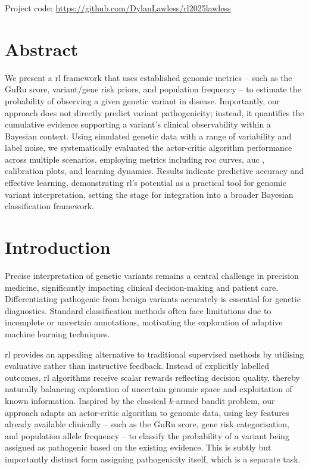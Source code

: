  
\vfill
\noindent Project code: \href{https://github.com/DylanLawless/rl2025lawless}{https://github.com/DylanLawless/rl2025lawless}

\clearpage
 

\section*{Abstract}

We present a \ac{rl} framework that uses established genomic metrics -- such as the GuRu score, variant/gene risk priors, and population frequency -- to estimate the probability of observing a given genetic variant in disease. Importantly, our approach does not directly predict variant pathogenicity; instead, it quantifies the cumulative evidence supporting a variant’s clinical observability within a Bayesian context. Using simulated genetic data with a range of variability and label noise, we systematically evaluated the actor-critic algorithm performance across multiple scenarios, employing metrics including \ac{roc} curves, \ac{auc} , calibration plots, and learning dynamics. Results indicate predictive accuracy and effective learning, demonstrating \ac{rl}’s potential as a practical tool for genomic variant interpretation, setting the stage for integration into a broader Bayesian classification framework.


\section{Introduction}
Precise interpretation of genetic variants remains a central challenge in precision medicine, significantly impacting clinical decision-making and patient care. Differentiating pathogenic from benign variants accurately is essential for genetic diagnostics. Standard classification methods often face limitations due to incomplete or uncertain annotations, motivating the exploration of adaptive machine learning techniques.

\ac{rl} provides an appealing alternative to traditional supervised methods by utilising evaluative rather than instructive feedback. Instead of explicitly labelled outcomes, \ac{rl} algorithms receive scalar rewards reflecting decision quality, thereby naturally balancing exploration of uncertain genomic space and exploitation of known information. Inspired by the classical $k$-armed bandit problem, our approach adapts an actor-critic algorithm to genomic data, using key features already available clinically -- such as the GuRu score, gene risk categorisation, and population allele frequency -- to classify the probability of a variant being assigned as pathogenic based on the existing evidence.
This is subtly but importantly distinct form assigning pathogenicity itself, which is a separate task.




